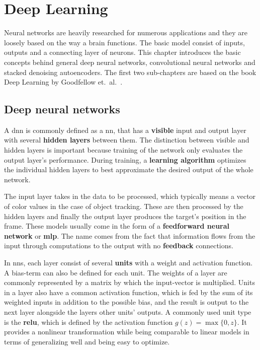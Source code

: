 \section{Deep Learning}

Neural networks are heavily researched for numerous applications and they are loosely
based on the way a brain functions. The basic model consist of inputs, outputs and a
connecting layer of neurons. This chapter introduces the basic concepts behind general
deep neural networks, convolutional neural networks and stacked denoising autoencoders.
The first two sub-chapters are based on the book Deep Learning by Goodfellow et.~al.~\cite{DEEP_LEARNING}.

\subsection{Deep neural networks}

A \ac{dnn} is commonly defined as a \ac{nn}, that has a \textbf{visible} input and
output layer with several \textbf{hidden layers} between them. The distinction between
visible and hidden layers is important because training of the network only evaluates
the output layer's performance. During training, a \textbf{learning algorithm} optimizes
the individual hidden layers to best approximate the desired output of the whole network.

The input layer takes in the data to be processed, which typically means a vector of
color values in the case of object tracking. These are then processed by the hidden
layers and finally the output layer produces the target's position in the frame. These
models usually come in the form of a \textbf{feedforward neural network} or
\textbf{\ac{mlp}}. The name comes from the fact that information flows from the input
through computations to the output with no \textbf{feedback} connections.

In \ac{nn}s, each layer consist of several \textbf{units} with a weight and activation
function. A bias-term can also be defined for each unit. The weights of a layer are
commonly represented by a matrix by which the input-vector is multiplied. Units in a
layer also have a common activation function, which is fed by the sum of its weighted
inputs in addition to the possible bias, and the result is output to the next layer
alongside the layers other units' outputs. A commonly used unit type is the \textbf{\ac{relu}},
which is defined by the activation function $g (z) = \max\{0,z\}$. It provides a
nonlinear transformation while being comparable to linear models in terms of generalizing
well and being easy to optimize.

